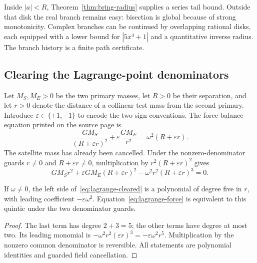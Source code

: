 Inside \(|a|<R\), Theorem~\ref{thm:bring-radius} supplies a series tail bound.
Outside that disk the real branch remains easy: bisection is global because of
strong monotonicity.  Complex branches can be continued by overlapping
rational disks, each equipped with a lower bound for \(|5x^4+1|\) and a
quantitative inverse radius.  The branch history is a finite path certificate.

\subsection{Clearing the Lagrange-point denominators}

Let \(M_S,M_E>0\) be the two primary masses, let \(R>0\) be their separation,
and let \(r>0\) denote the distance of a collinear test mass from the second
primary.  Introduce \(\varepsilon\in\{+1,-1\}\) to encode the two sign
conventions.  The force-balance equation printed on the source page is
\begin{equation}\label{eq:lagrange-force}
 \frac{GM_S}{(R+\varepsilon r)^2}
 +\varepsilon\frac{GM_E}{r^2}
 =\omega^2(R+\varepsilon r).
\end{equation}
The satellite mass has already been cancelled.  Under the nonzero-denominator
guards \(r\ne0\) and \(R+\varepsilon r\ne0\), multiplication by
\(r^2(R+\varepsilon r)^2\) gives
\begin{equation}\label{eq:lagrange-cleared}
 GM_Sr^2+\varepsilon GM_E(R+\varepsilon r)^2
 -\omega^2r^2(R+\varepsilon r)^3=0.
\end{equation}

\begin{theorem}
\label{thm:lagrange-quintic}
If \(\omega\ne0\), the left side of~\eqref{eq:lagrange-cleared} is a polynomial
of degree five in \(r\), with leading coefficient \(-\varepsilon\omega^2\).
Equation~\eqref{eq:lagrange-force} is equivalent to this quintic under the two
denominator guards.
\end{theorem}

\begin{proof}
The last term has degree \(2+3=5\); the other terms have degree at most two.
Its leading monomial is
\(-\omega^2r^2(\varepsilon r)^3=-\varepsilon\omega^2r^5\).
Multiplication by the nonzero common denominator is reversible.  All statements
are polynomial identities and guarded field cancellation.
\end{proof}

